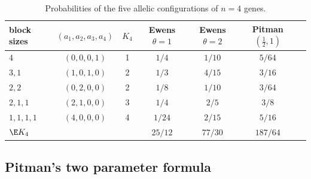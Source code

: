 \begin{table}[t]
\centering\small
\caption{Probabilities of the five allelic configurations of $n=4$ genes.}
\label{toolkit:tab:n4}
\begin{tabular}{lcccccc}
\toprule
block sizes & $(a_1,a_2,a_3,a_4)$ & $K_4$ & Ewens $\theta=1$ & Ewens $\theta=2$ & Pitman $(\tfrac12,1)$\\
\midrule
$4$ & $(0,0,0,1)$ & 1 & $1/4$ & $1/10$ & $5/64$\\
$3,1$ & $(1,0,1,0)$ & 2 & $1/3$ & $4/15$ & $3/16$\\
$2,2$ & $(0,2,0,0)$ & 2 & $1/8$ & $1/10$ & $3/64$\\
$2,1,1$ & $(2,1,0,0)$ & 3 & $1/4$ & $2/5$ & $3/8$\\
$1,1,1,1$ & $(4,0,0,0)$ & 4 & $1/24$ & $2/15$ & $5/16$\\
\midrule
$\E K_4$ & & & $25/12$ & $77/30$ & $187/64$\\
\bottomrule
\end{tabular}
\end{table}

\subsection{Pitman's two parameter formula}\label{toolkit:sec:pitman}

